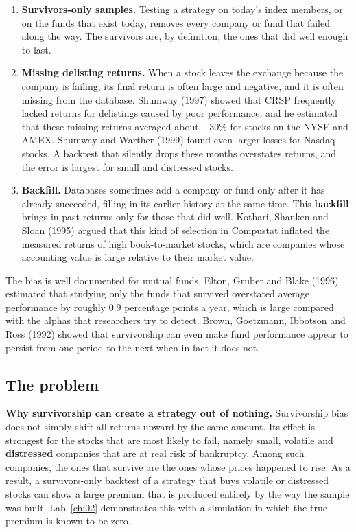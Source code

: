 \begin{enumerate}
  \item \textbf{Survivors-only samples.} Testing a strategy on today's index members, or on the funds that exist today, removes every company or fund that failed along the way. The survivors are, by definition, the ones that did well enough to last.
  \item \textbf{Missing delisting returns.} When a stock leaves the exchange because the company is failing, its final return is often large and negative, and it is often missing from the database. Shumway (1997) showed that CRSP frequently lacked returns for delistings caused by poor performance, and he estimated that these missing returns averaged about $-30$\% for stocks on the NYSE and AMEX. Shumway and Warther (1999) found even larger losses for Nasdaq stocks. A backtest that silently drops these months overstates returns, and the error is largest for small and distressed stocks.
  \item \textbf{Backfill.} Databases sometimes add a company or fund only after it has already succeeded, filling in its earlier history at the same time. This \textbf{backfill} brings in past returns only for those that did well. Kothari, Shanken and Sloan (1995) argued that this kind of selection in Compustat inflated the measured returns of high book-to-market stocks, which are companies whose accounting value is large relative to their market value.
\end{enumerate}

The bias is well documented for mutual funds. Elton, Gruber and Blake (1996) estimated that studying only the funds that survived overstated average performance by roughly 0.9 percentage points a year, which is large compared with the alphas that researchers try to detect. Brown, Goetzmann, Ibbotson and Ross (1992) showed that survivorship can even make fund performance appear to persist from one period to the next when in fact it does not.

\subsection{The problem}

\textbf{Why survivorship can create a strategy out of nothing.} Survivorship bias does not simply shift all returns upward by the same amount. Its effect is strongest for the stocks that are most likely to fail, namely small, volatile and \textbf{distressed} companies that are at real risk of bankruptcy. Among such companies, the ones that survive are the ones whose prices happened to rise. As a result, a survivors-only backtest of a strategy that buys volatile or distressed stocks can show a large premium that is produced entirely by the way the sample was built. Lab~\ref{ch:02} demonstrates this with a simulation in which the true premium is known to be zero.

